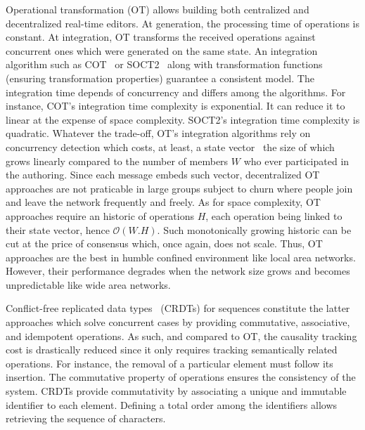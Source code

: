 \begin{asparadesc}
\item [Operational transformation] (OT) allows building both centralized and
  decentralized real-time editors. At generation, the processing time of
  operations is constant. At integration, OT transforms the received operations
  against concurrent ones which were generated on the same state. An integration
  algorithm such as COT~\cite{sun2009contextbased} or
  SOCT2~\cite{vidot2000copies} along with transformation functions (ensuring
  transformation properties) guarantee a consistent model. The integration time
  depends of concurrency and differs among the algorithms.  For instance, COT's
  integration time complexity is exponential. It can reduce it to linear at the
  expense of space complexity. SOCT2's integration time complexity is quadratic.
  Whatever the trade-off, OT's integration algorithms rely on concurrency
  detection which costs, at least, a state
  vector~\cite{charronbost1991concerning} the size of which grows linearly
  compared to the number of members $W$ who ever participated in the
  authoring. Since each message embeds such vector, decentralized OT approaches
  are not praticable in large groups subject to churn where people join and
  leave the network frequently and freely.  As for space complexity, OT
  approaches require an historic of operations $H$, each operation being linked
  to their state vector, hence $\mathcal{O}(W.H)$. Such monotonically growing
  historic can be cut at the price of consensus which, once again, does not
  scale. Thus, OT approaches are the best in humble confined environment like
  local area networks. However, their performance degrades when the network size
  grows and becomes unpredictable like wide area networks.

\item [Conflict-free replicated data types~\cite{shapiro2011comprehensive,
    shapiro2011conflict}] (CRDTs) for sequences constitute the latter approaches
  which solve concurrent cases by providing commutative, associative, and
  idempotent operations. As such, and compared to OT, the causality tracking
  cost is drastically reduced since it only requires tracking semantically
  related operations. For instance, the removal of a particular element must
  follow its insertion. The commutative property of operations ensures the
  consistency of the system. CRDTs provide commutativity by associating a unique
  and immutable identifier to each element. Defining a total order among the
  identifiers allows retrieving the sequence of characters.


\end{asparadesc}
